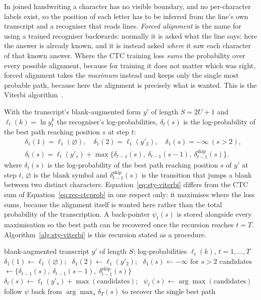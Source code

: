 In joined handwriting a character has no visible boundary, and no per-character labels exist, so the position of each letter has to be inferred from the line's own transcript and a recogniser that reads lines. \emph{Forced alignment} is the name for using a trained recogniser backwards: normally it is asked what the line says; here the answer is already known, and it is instead asked \emph{where} it saw each character of that known answer. Where the CTC training loss \emph{sums} the probability over every possible alignment, because for training it does not matter which was right, forced alignment takes the \emph{maximum} instead and keeps only the single most probable path, because here the alignment is precisely what is wanted. This is the Viterbi algorithm~\cite{viterbi1967}.

With the transcript's blank-augmented form $y'$ of length $S=2U+1$ and $\ell_t(k)=\ln y_t^k$ the recogniser's log-probabilities, $\delta_t(s)$ is the log-probability of the best path reaching position $s$ at step $t$:
\begin{equation}
\begin{split}
&\delta_1(1)=\ell_1(\varnothing),\quad\delta_1(2)=\ell_1(y'_2),\quad\delta_1(s)=-\infty\ (s>2),\\
&\delta_t(s)=\ell_t(y'_s)+\max\bigl\{\delta_{t-1}(s),\ \delta_{t-1}(s-1),\ \delta^{\mathrm{skip}}_{t-1}(s)\bigr\}.
\end{split}
\label{eq:sty-viterbi}
\end{equation}
where $\delta_t(s)$ is the log-probability of the best path reaching position $s$ of $y'$ at step $t$, $\varnothing$ is the blank symbol and $\delta^{\mathrm{skip}}_{t-1}(s)$ is the transition that jumps a blank between two distinct characters. Equation~\ref{eq:sty-viterbi} differs from the CTC sum of Equation~\ref{eq:rec-ctcprob} in one respect only: it maximises where the loss sums, because the alignment itself is wanted here rather than the total probability of the transcription. A back-pointer $\psi_t(s)$ is stored alongside every maximisation so the best path can be recovered once the recursion reaches $t=T$. Algorithm~\ref{alg:sty-viterbi} is this recursion stated as a procedure.

\begin{algorithm}[!htbp]
\caption{Forced alignment by Viterbi recursion (per time step $t$)}
\label{alg:sty-viterbi}
\begin{algorithmic}[1]
\REQUIRE blank-augmented transcript $y'$ of length $S$; log-probabilities $\ell_t(k)$, $t=1,\ldots,T$
    \STATE $\delta_1(1)\leftarrow\ell_1(\varnothing)$; \ $\delta_1(2)\leftarrow\ell_1(y'_2)$; \ $\delta_1(s)\leftarrow-\infty$ for $s>2$
\ELSE
        \STATE candidates $\leftarrow\{\delta_{t-1}(s),\ \delta_{t-1}(s-1),\ \delta^{\mathrm{skip}}_{t-1}(s)\}$ 
        \STATE $\delta_t(s)\leftarrow\ell_t(y'_s)+\max(\text{candidates})$; \ $\psi_t(s)\leftarrow\arg\max(\text{candidates})$
    \ENDFOR
\ENDIF
{}
    \STATE follow $\psi$ back from $\arg\max_s\delta_T(s)$ to recover the single best path 
\ENDIF
\end{algorithmic}
\end{algorithm}

